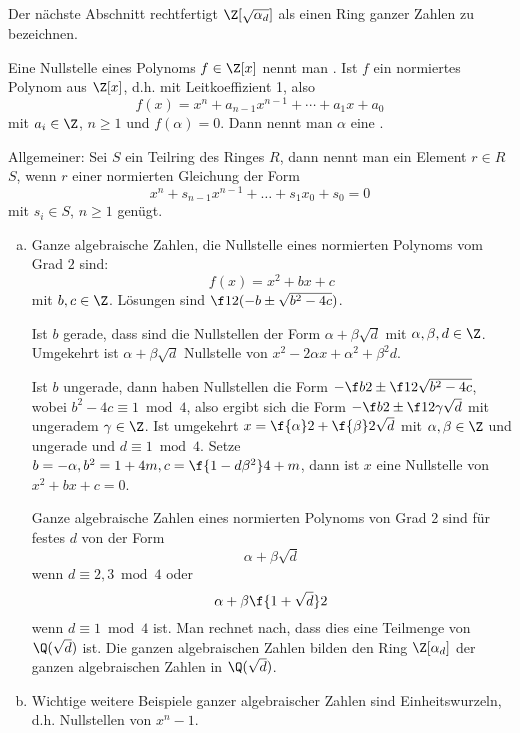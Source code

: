 Der nächste Abschnitt rechtfertigt $\Z[\sqrt{\alpha_d}]$ als einen Ring ganzer Zahlen zu bezeichnen.

\begin{df} \label{4.14}
	Eine Nullstelle eines Polynoms $f \in \Z[x]$ nennt man .
	Ist $f$ ein normiertes Polynom aus $\Z[x]$, d.h. mit Leitkoeffizient 1, also
	\[
		f(x) = x^n + a_{n-1} x^{n-1} + \dotsb + a_1 x + a_0
	\]
	mit $a_i \in \Z$, $n \ge 1$ und $f(\alpha) = 0$.
	Dann nennt man $\alpha$ eine .

	Allgemeiner: Sei $S$ ein Teilring des Ringes $R$, dann nennt man ein Element $r \in R$  $S$, wenn $r$ einer normierten Gleichung der Form
	\[
		x^n + s_{n-1} x^{n-1} + \dotsc + s_1 x_0 + s_0 = 0
	\]
	mit $s_i \in S$, $n \ge 1$ genügt.
\end{df}

\begin{ex} \label{4.15}
	\begin{enumerate}[a)]
		\item
			Ganze algebraische Zahlen, die Nullstelle eines normierten Polynoms vom Grad $2$ sind:
			\[
				f(x) = x^2 + b x + c
			\]
			mit $b, c \in \Z$.
			Lösungen sind $\f 12 (-b \pm \sqrt{b^2 - 4c})$.

			Ist $b$ gerade, dass sind die Nullstellen der Form $\alpha + \beta \sqrt d$ mit $\alpha, \beta, d \in \Z$.
			Umgekehrt ist $\alpha + \beta \sqrt d$ Nullstelle von $x^2 - 2 \alpha x + \alpha^2 + \beta^2 d$.

			Ist $b$ ungerade, dann haben Nullstellen die Form $-\f b2 \pm \f 12 \sqrt{b^2 - 4c}$, wobei $b^2 - 4c \equiv 1 \bmod 4$, also ergibt sich die Form $- \f b2 \pm \f 12 \gamma \sqrt d$ mit ungeradem $\gamma \in \Z$.
			Ist umgekehrt $x = \f{\alpha}2 + \f{\beta}2 \sqrt{d}$ mit $\alpha, \beta \in \Z$ und ungerade und $d \equiv 1 \bmod 4$.
			Setze $b = -\alpha, b^2 = 1 + 4m, c = \f {1-d\beta^2}4 + m$, dann ist $x$ eine Nullstelle von $x^2 + bx + c = 0$.

			Ganze algebraische Zahlen eines normierten Polynoms von Grad 2 sind für festes $d$ von der Form
			\[
				\alpha + \beta \sqrt d
			\]
			wenn $d \equiv 2, 3 \bmod 4$ oder
			\[
				\alpha + \beta \f{1 + \sqrt d}2
			\]
			wenn $d \equiv 1 \bmod 4$ ist.
			Man rechnet nach, dass dies eine Teilmenge von $\Q(\sqrt d)$ ist.
			Die ganzen algebraischen Zahlen bilden den Ring $\Z[\alpha_d]$ der ganzen algebraischen Zahlen in $\Q(\sqrt d)$.
		\item
			Wichtige weitere Beispiele ganzer algebraischer Zahlen sind Einheitswurzeln, d.h. Nullstellen von $x^n - 1$.
	\end{enumerate}
\end{ex}

